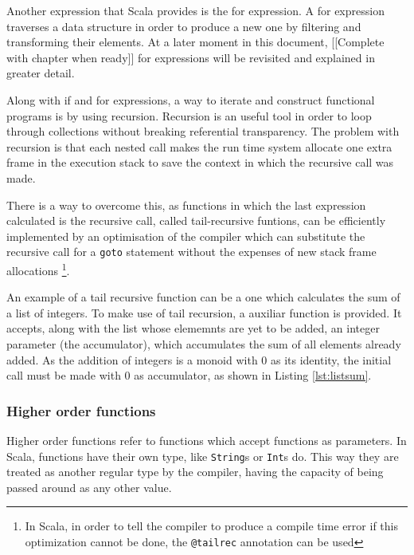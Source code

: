 \documentclass[../main.tex]{subfiles}
\begin{document}
Another expression that Scala provides is the for expression. A for expression
traverses a data structure in order to produce a new one by filtering and
transforming their elements. At a later moment in this document, [[Complete
with chapter when ready]] for expressions will be revisited and explained in
greater detail.

Along with if and for expressions, a way to iterate and construct
functional programs is by using recursion. Recursion is an useful tool in order
to loop through collections without breaking referential transparency. The
problem with recursion is that each nested call makes the run time system allocate one
extra frame in the execution stack to save the context in which the recursive call was
made.

There is a way to overcome this, as functions in which the last expression
calculated is the recursive call, called tail-recursive funtions, can be efficiently
implemented by an optimisation of the compiler which can substitute the
recursive call for a \texttt{goto} statement without the expenses of new stack
frame allocations \autocite{Steele1977DebunkingGoto} \footnote{In Scala, in order
to tell the compiler to produce a compile time error if this optimization cannot be done, the
\texttt{@tailrec} annotation can be
used\autocite{ScalaScala.annotation.tailrec}}.

An example of a tail recursive function can be a one which calculates the sum of a list of integers. To
make use of tail recursion, a auxiliar function is provided. It accepts, along with the list whose elememnts are yet to
be added, an integer parameter (the accumulator), which accumulates the sum of all elements already added. As the addition 
of integers is a monoid with 0 as its identity, the initial call must be made with 0 as accumulator, as shown in 
Listing \ref{lst:listsum}.




\subsubsection{Higher order functions} Higher order functions refer to functions
which accept functions as parameters. In Scala, functions have their own type,
like \texttt{String}s or \texttt{Int}s do. This way they are treated as another
regular type by the compiler, having the capacity of being passed around as any
other value.
\end{document}
